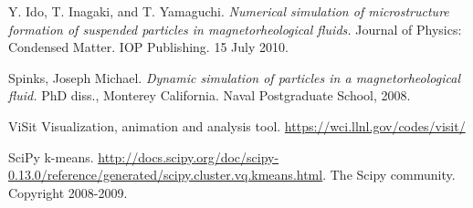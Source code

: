 \newpage
\vspace{40pt}
\begin{thebibliography}{9}


Y. Ido, T. Inagaki, and T. Yamaguchi.
\emph{Numerical simulation of microstructure formation of suspended particles in magnetorheological fluids.}  
Journal of Physics: Condensed Matter. 
IOP Publishing.
15 July 2010. 

Spinks, Joseph Michael. 
\emph{Dynamic simulation of particles in a magnetorheological fluid.}
PhD diss., Monterey California. 
Naval Postgraduate School, 2008.

ViSit Visualization, animation and analysis tool.
\newline 
\url{https://wci.llnl.gov/codes/visit/}

SciPy k-means. 
\url{http://docs.scipy.org/doc/scipy-0.13.0/reference/generated/scipy.cluster.vq.kmeans.html}.
The Scipy community. Copyright 2008-2009.


\end{thebibliography}






